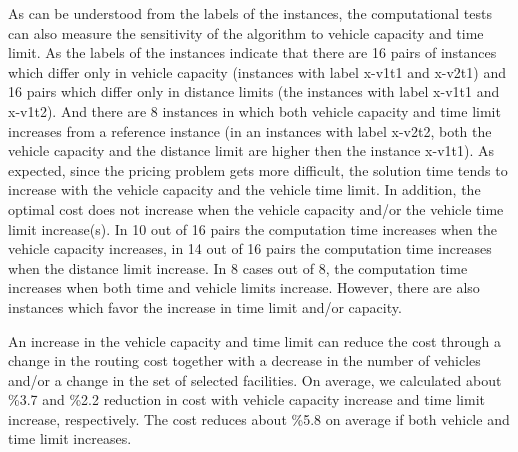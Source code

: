 As can be understood from the labels of the instances, the computational tests
can also measure the sensitivity of the algorithm to vehicle capacity and time
limit. As the labels of the instances indicate that there are 16 pairs of instances
which differ only in vehicle capacity (instances with label x-v1t1 and x-v2t1)
and 16 pairs which differ only in distance limits (the instances with label x-v1t1
and x-v1t2). And there are 8 instances in which both vehicle capacity
and time limit increases from a reference instance (in an instances with label
x-v2t2, both the vehicle capacity and the distance limit are higher then
the instance x-v1t1).
As expected, since the pricing problem gets more difficult, the solution time
tends to increase with the vehicle capacity and the vehicle time limit. In addition,
the optimal cost does not increase when the vehicle capacity and/or the vehicle
time limit increase(s). In 10 out of 16 pairs the computation time increases
when the vehicle capacity increases, in 14 out of 16 pairs the computation time
increases when the distance limit increase. In 8 cases out of 8, the computation time
increases when both time and vehicle limits increase.
However, there are also instances which favor the increase in time limit and/or capacity.

An increase in the vehicle capacity and time limit can reduce the cost through a change
in the routing cost together with a decrease in the number of vehicles and/or a change
in the set of selected facilities.
On average, we calculated about \%3.7 and \%2.2 reduction in cost
with vehicle capacity increase and time limit increase, respectively. The cost
reduces about \%5.8 on average if both vehicle and time limit increases.


